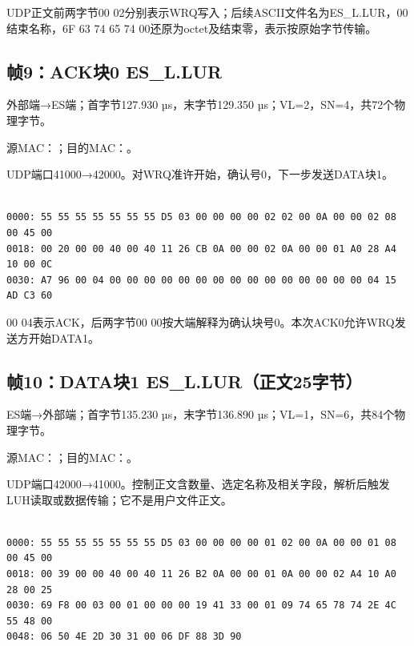 UDP正文前两字节00 02分别表示WRQ写入；后续ASCII文件名为ES\_L.LUR，00结束名称，6F 63 74 65 74 00还原为octet及结束零，表示按原始字节传输。

\subsection*{帧9：ACK块0 ES\_L.LUR}

外部端→ES端；首字节127.930 µs，末字节129.350 µs；VL=2，SN=4，共72个物理字节。

源MAC：；目的MAC：。

UDP端口41000→42000。对WRQ准许开始，确认号0，下一步发送DATA块1。

\par\noindent\begin{minipage}{\linewidth}
\begin{lstlisting}[caption={帧9物理字节，偏移0000--0047}]

0000: 55 55 55 55 55 55 55 D5 03 00 00 00 00 02 02 00 0A 00 00 02 08 00 45 00
0018: 00 20 00 00 40 00 40 11 26 CB 0A 00 00 02 0A 00 00 01 A0 28 A4 10 00 0C
0030: A7 96 00 04 00 00 00 00 00 00 00 00 00 00 00 00 00 00 00 04 15 AD C3 60

\end{lstlisting}
\end{minipage}\par

00 04表示ACK，后两字节00 00按大端解释为确认块号0。本次ACK0允许WRQ发送方开始DATA1。

\subsection*{帧10：DATA块1 ES\_L.LUR（正文25字节）}

ES端→外部端；首字节135.230 µs，末字节136.890 µs；VL=1，SN=6，共84个物理字节。

源MAC：；目的MAC：。

UDP端口42000→41000。控制正文含数量、选定名称及相关字段，解析后触发LUH读取或数据传输；它不是用户文件正文。

\par\noindent\begin{minipage}{\linewidth}
\begin{lstlisting}[caption={帧10物理字节，偏移0000--0053}]

0000: 55 55 55 55 55 55 55 D5 03 00 00 00 00 01 02 00 0A 00 00 01 08 00 45 00
0018: 00 39 00 00 40 00 40 11 26 B2 0A 00 00 01 0A 00 00 02 A4 10 A0 28 00 25
0030: 69 F8 00 03 00 01 00 00 00 19 41 33 00 01 09 74 65 78 74 2E 4C 55 48 00
0048: 06 50 4E 2D 30 31 00 06 DF 88 3D 90

\end{lstlisting}
\end{minipage}\par

